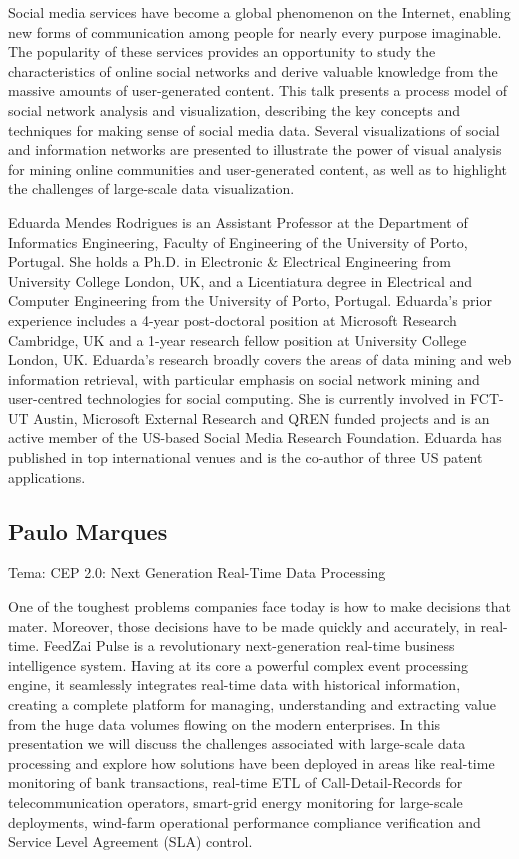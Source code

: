 Social media services have become a global phenomenon on the Internet, enabling new forms of communication among people for nearly every purpose imaginable. The popularity of these services provides an opportunity to study the characteristics of online social networks and derive valuable knowledge from the massive amounts of user-generated content. This talk presents a process model of social network analysis and visualization, describing the key concepts and techniques for making sense of social media data. Several visualizations of social and information networks are presented to illustrate the power of visual analysis for mining online communities and user-generated content, as well as to highlight the challenges of large-scale data visualization.

Eduarda Mendes Rodrigues is an Assistant Professor at the Department of 
Informatics Engineering, Faculty of Engineering of the University of Porto, Portugal. She holds a Ph.D. in Electronic \& Electrical Engineering from University College London, UK, and a Licentiatura degree in Electrical and Computer Engineering from the University of Porto, Portugal. Eduarda's prior experience includes a 4-year post-doctoral position at Microsoft Research Cambridge, UK and a 1-year research fellow position at University College London, UK. Eduarda's research broadly covers the areas of data mining and web information retrieval, with particular emphasis on social network mining and user-centred technologies for social computing. She is currently involved in FCT-UT Austin, Microsoft External Research and QREN funded projects and is an active member of the US-based Social Media Research Foundation. Eduarda has published in top international venues and is the co-author of three US patent applications.

\subsection{Paulo Marques}
Tema: CEP 2.0: Next Generation Real-Time Data Processing

One of the toughest problems companies face today is how to make decisions that mater. Moreover, those decisions have to be made quickly and accurately, in real-time. FeedZai Pulse is a revolutionary next-generation real-time business intelligence system. Having at its core a powerful complex event processing engine, it seamlessly integrates real-time data with historical information, creating a complete platform for managing, understanding and extracting value from the huge data volumes flowing on the modern enterprises. In this presentation we will discuss the challenges associated with large-scale data processing and explore how solutions have been deployed in areas like real-time monitoring of bank transactions, real-time ETL of Call-Detail-Records for telecommunication operators, smart-grid energy monitoring for large-scale deployments, wind-farm operational performance compliance verification and Service Level Agreement (SLA) control.

